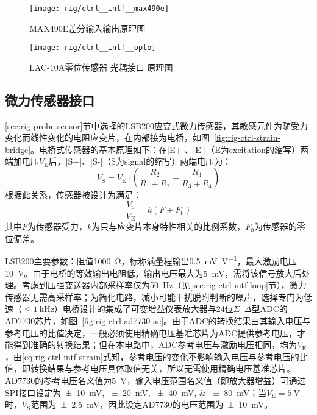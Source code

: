
\begin{figure}[p]
\centering
\texttt{[image: rig/ctrl\_\_intf\_\_max490e]}
\caption{MAX490E差分输入输出原理图}
\label{fig:rig-ctrl-intf-max490e}
\end{figure}

\begin{figure}[p]
\centering
\texttt{[image: rig/ctrl\_\_intf\_\_opto]}
\caption{LAC-10A零位传感器 \csep 光耦接口 \csep 原理图}
\label{fig:rig-ctrl-intf-opto}
\end{figure}

\subsection{微力传感器接口}\label{sec:rig-ctrl-intf-strain}

\ref{sec:rig-probe-sensor}节中选择的LSB200应变式微力传感器，其敏感元件为随受力变化而线性变化的电阻应变片，在内部接为电桥，如图~\ref{fig:rig-ctrl-strain-bridge}。电桥式传感器的基本原理如下：在\bverb|E+|、\bverb|E-|（E为excitation的缩写）两端加电压$V_{\mathrm{E}}$后，\bverb|S+|、\bverb|S-|（S为signal的缩写）两端电压为：
\[
V_{\mathrm{S}} = V_{\mathrm{E}} \cdot (\frac{R_2}{R_1 + R_2} - \frac{R_4}{R_3 + R_4})
\]
根据此关系，传感器被设计为满足：
\begin{equation}
\label{eq:rig-ctrl-intf-strain}
\frac{V_{\mathrm{S}}}{V_{\mathrm{E}}} = k (F + F_0)
\end{equation}
其中$F$为传感器受力，$k$为只与应变片本身特性相关的比例系数，$F_0$为传感器的零位偏差。

LSB200主要参数：阻值\SI{1000}{\ohm}，标称满量程输出\SI{0.5}{\mV\per\V}，最大激励电压\SI{10}{\V}。由于电桥的等效输出电阻低，输出电压最大为\SI{5}{\mV}，需将该信号放大后处理。考虑到压强变送器内部采样率仅为\SI{50}{\Hz}（见\ref{sec:rig-ctrl-intf-loop}节），微力传感器无需高采样率；为简化电路，减小可能干扰脱附判断的噪声，选择专门为低速（$\leq\SI{1}{\kHz}$）电桥设计的集成了可变增益仪表放大器与24位$\Sigma$--$\Delta$型ADC的AD7730芯片，如图~\ref{fig:rig-ctrl-ad7730-ac}。由于ADC的转换结果由其输入电压与参考电压的比值决定，一般必须使用精确电压基准芯片为ADC提供参考电压，才能得到准确的转换结果；但在本电路中，ADC参考电压与激励电压相同，均为$V_{\mathrm{E}}$，由\eqref{eq:rig-ctrl-intf-strain}式知，参考电压的变化不影响输入电压与参考电压的比值，即转换结果与参考电压具体取值无关，所以无需使用精确电压基准芯片。AD7730的参考电压名义值为\SI{5}{\V}，输入电压范围名义值（即放大器增益）可通过SPI接口设定为\SIlist[list-separator={、},list-final-separator={、或}]{\pm 10;\pm 20;\pm 40;\pm 80}{\mV}；当$V_{\mathrm{E}} = \SI{5}{\V}$时，$V_{\mathrm{S}}$范围为\SI{\pm 2.5}{\mV}，因此设定AD7730的电压范围为\SI{\pm 10}{\mV}。

